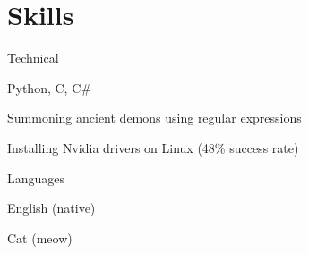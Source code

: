 \section{Skills}
\begin{resumeList}{Technical}{}{}{}{}
    \item Python, C, C\#
    \item Summoning ancient demons using regular expressions
    \item Installing Nvidia drivers on Linux (48\% success rate)
\end{resumeList}

\begin{resumeList}{Languages}{}{}{}{}
    \item English (native)
    \item Cat (meow)
\end{resumeList}
